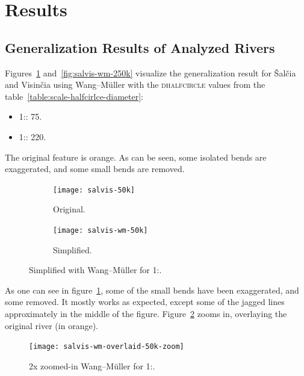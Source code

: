 \documentclass[a4paper]{article}
\newcommand{\WM}{Wang--M{\"u}ller}
\begin{document}
\section{Results}

\subsection{Generalization Results of Analyzed Rivers}
\label{sec:generalization-results-of-analyzed-rivers}

Figures~\ref{fig:salvis-wm-50k} and~\ref{fig:salvis-wm-250k} visualize
the generalization result for Šalčia and Visinčia using {\WM} with the
\textsc{dhalfcircle} values from the
table~\ref{table:scale-halfcirlce-diameter}:

\begin{itemize}
    \item 1:: 75.
    \item 1:: 220.
\end{itemize}

The original feature is orange. As can be seen, some isolated bends are
exaggerated, and some small bends are removed.

\begin{figure}[ht]
    \centering
    \begin{subfigure}[b]{.49\textwidth}
        \texttt{[image: salvis-50k]}
        \caption{Original.}
    \end{subfigure}
    \hfill
    \begin{subfigure}[b]{.49\textwidth}
        \centering
        \texttt{[image: salvis-wm-50k]}
        \caption{Simplified.}
    \end{subfigure}
    \caption{Simplified with {\WM} for 1:.}
    \label{fig:salvis-wm-50k}
\end{figure}

As one can see in figure~\ref{fig:salvis-wm-50k}, some of the small bends have
been exaggerated, and some removed. It mostly works as expected, except some of
the jagged lines approximately in the middle of the figure.
Figure~\ref{fig:salvis-wm-50k-overlaid-zoom} zooms in, overlaying the original
river (in orange).

\begin{figure}[ht]
    \centering
    \texttt{[image: salvis-wm-overlaid-50k-zoom]}
    \caption{2x zoomed-in {\WM} for 1:.}
    \label{fig:salvis-wm-50k-overlaid-zoom}
\end{figure}
\end{document}
